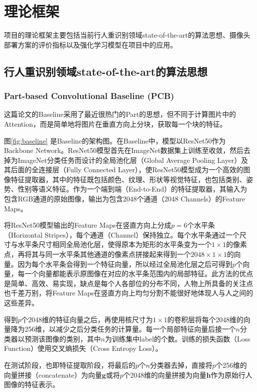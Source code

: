 \chapter{理论框架}
项目的理论框架主要包括当前行人重识别领域state-of-the-art的算法思想、摄像头部署方案的评价指标以及强化学习模型在项目中的应用。

\section{行人重识别领域state-of-the-art的算法思想}

\subsection{Part-based Convolutional Baseline (PCB)}
这篇论文的Baseline采用了最近很热门的Part的思想，但不同于计算图片中的Attention，而是简单地将图片在垂直方向上分块，获取每一个块的特征。

图\ref{fig:baseline} 是Baseline的架构图。在Baseline中，模型以ResNet50作为Backbone Network。ResNet50模型首先在ImageNet数据集上训练至收敛，然后去掉为ImageNet分类任务而设计的全局池化层（Global Average Pooling Layer）及其后面的全连接层（Fully Connected Layer），使ResNet50模型成为一个高效的图像特征提取器，其中的特征既包括颜色、纹理、形状等视觉特征，也包括类别、姿势、性别等语义特征。作为一个端到端（End-to-End）的特征提取器，其输入为包含RGB通道的原始图像，输出为包含2048个通道（2048 Channels）的Feature Maps。

将ResNet50模型输出的Feature Maps在竖直方向上分成$p=6$个水平条（Horizontal Stripes），每个通道（Channel）保持独立。每个水平条通过一个尺寸与水平条尺寸相同全局池化层，使得原本为矩形的水平条变为一个$1\times1$的像素点，再将其与同一水平条其他通道的像素点拼接起来得到一个$2048\times1\times1$的向量。因为每个水平条会得到一个特征向量，所以经过全局池化层之后可得到$p$个向量，每一个向量都能表示原图像在对应的水平条范围内的局部特征。此方法的优点是简单、高效、易实现，缺点是每个人各部位的分布不同，人物上所具备的关注点也千差万别，将Feature Maps在竖直方向上均匀分割不能很好地体现人与人之间的这些差异。

得到$p$个2048维的特征向量之后，再使用核尺寸为$1\times1$的卷积层将每个2048维的向量降为256维，以减少之后分类任务的计算量。每一个局部特征向量后接一个$n$分类器以预测该图像的类别，其中$n$为训练集中label的个数。训练的损失函数（Loss Function）使用交叉熵损失（Cross Entropy Loss）。

在测试阶段，也即特征提取阶段，将最后的$p$个$n$分类器去掉，直接将$p$个256维的向量拼接（concatenate）为向量$\boldsymbol{g}$或将$p$个2048维的向量拼接为向量$\boldsymbol{h}$作为原始行人图像的特征表示。

